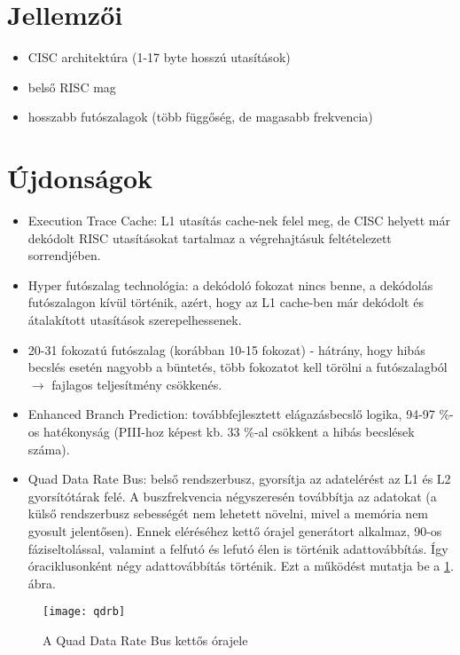 \section{Jellemzői}
\begin{itemize}
    \item CISC architektúra (1-17 byte hosszú utasítások)
    \item belső RISC mag
    \item hosszabb futószalagok (több függőség, de magasabb frekvencia)
\end{itemize}

\section{Újdonságok}
\begin{itemize}
    \item Execution Trace Cache: L1 utasítás cache-nek felel meg, de CISC helyett már dekódolt RISC utasításokat tartalmaz a végrehajtásuk feltételezett sorrendjében.
    \item Hyper futószalag technológia: a dekódoló fokozat nincs benne, a dekódolás futószalagon kívül történik, azért, hogy az L1 cache-ben már dekódolt és átalakított utasítások szerepelhessenek.
    \item 20-31 fokozatú futószalag (korábban 10-15 fokozat) - hátrány, hogy hibás becslés esetén nagyobb a büntetés, több fokozatot kell törölni a futószalagból $\rightarrow$ fajlagos teljesítmény csökkenés.
    \item Enhanced Branch Prediction: továbbfejlesztett elágazásbecslő logika, 94-97 \%-os hatékonyság (PIII-hoz képest kb. 33 \%-al csökkent a hibás becslések száma).
    \item Quad Data Rate Bus: belső rendszerbusz, gyorsítja az adatelérést az L1 és L2 gyorsítótárak felé. A buszfrekvencia négyszeresén továbbítja az adatokat (a külső rendszerbusz sebességét nem lehetett növelni, mivel a memória nem gyosult jelentősen). Ennek eléréséhez kettő órajel generátort alkalmaz, 90\textdegree-os fáziseltolással, valamint a felfutó és lefutó élen is történik adattovábbítás. Így óraciklusonként négy adattovábbítás történik. Ezt a működést mutatja be a \ref{fig:qdrb}. ábra.
\end{itemize}
\begin{figure}[h]
    \texttt{[image: qdrb]}
    \centering
    \caption{A Quad Data Rate Bus kettős órajele}
    \label{fig:qdrb}
\end{figure}